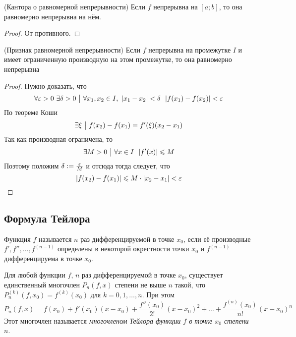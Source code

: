\begin{theorem} (Кантора о равномерной непрерывности)
	Если $f$ непрерывна на $[a; b]$, то она равномерно непрерывна на нём.
\end{theorem}

\begin{proof}
	От противного.
\end{proof}

\begin{theorem} (Признак равномерной непрерывности)
	Если $f$ непрерывна на промежутке $I$ и имеет ограниченную производную на этом промежутке, то она равномерно непрерывна 
\end{theorem}

\begin{proof}
	Нужно доказать, что
	\[
		\forall \varepsilon > 0\ \exists \delta > 0 \ \big|\  \forall x_1, x_2 \in I,\ |x_1 - x_2| < \delta\ \ |f(x_1) - f(x_2)| < \varepsilon
	\]
	По теореме Коши
	\[
		\exists \xi \ \big|\  f(x_2) - f(x_1) = f'(\xi)(x_2 - x_1)
	\]
	Так как производная ограничена, то
	\[
		\exists M > 0 \ \big|\  \forall x \in I\ \ |f'(x)| \leqslant M
	\]
	Поэтому положим $\delta := \frac{\varepsilon}{M}$ и отсюда тогда следует, что
	\[
		|f(x_2) - f(x_1)| \leqslant M \cdot |x_2 - x_1| < \varepsilon
	\]
\end{proof}

\subsection{Формула Тейлора}


\begin{definition}
	Функция $f$ называется $n$ раз дифференцируемой в точке $x_0$, если её производные $f', f'', \ldots, f^{(n - 1)}$ определены в некоторой окрестности точки $x_0$ и $f^{(n - 1)}$ дифференцируема в точке $x_0$.
\end{definition}

\begin{lemma}
	Для любой функции $f$, $n$ раз дифференцируемой в точке $x_0$, существует единственный многочлен $P_n(f, x)$ степени не выше $n$ такой, что $P_n^{(k)}(f, x_0) = f^{(k)}(x_0)$ для $k = 0, 1, \ldots, n$. При этом
	\[
		P_n(f, x) = f(x_0) + f'(x_0)(x - x_0) + \frac{f''(x_0)}{2!}(x - x_0)^2 + \ldots + \frac{f^{(n)}(x_0)}{n!}(x - x_0)^n
 	\]
 	Этот многочлен называется \textit{многочленом Тейлора функции $f$ в точке $x_0$ степени $n$}.
\end{lemma}

